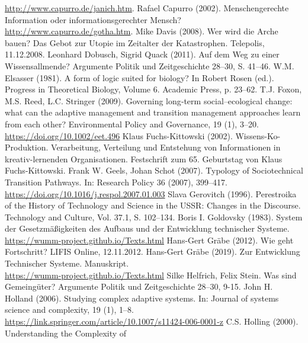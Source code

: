 \documentclass[11pt,a4paper]{article}
\begin{document}
\begin{thebibliography}{xxx}
  \url{http://www.capurro.de/janich.htm}.
 Rafael Capurro (2002). Menschengerechte Information oder
  informationsgerechter Mensch? \url{http://www.capurro.de/gotha.htm}.
 Mike Davis (2008). Wer wird die Arche bauen?  Das Gebot
  zur Utopie im Zeitalter der Katastrophen.  Telepolis, 11.12.2008.
 Leonhard Dobusch, Sigrid Quack (2011). Auf dem Weg zu
  einer Wissensallmende? Argumente Politik und Zeitgeschichte 28--30,
  S. 41--46.
 W.M. Elsasser (1981). A form of logic suited for
  biology? In Robert Rosen (ed.). Progress in Theoretical Biology, Volume 6.
  Academic Press, p. 23--62.
 T.J. Foxon, M.S. Reed, L.C. Stringer (2009). Governing
  long‐term social–ecological change: what can the adaptive management and
  transition management approaches learn from each other? Environmental Policy
  and Governance, 19 (1), 3--20.\\ \url{https://doi.org/10.1002/eet.496}
 Klaus Fuchs-Kittowski (2002). Wissens-Ko-Produktion.
  Verarbeitung, Verteilung und Entstehung von Informationen in
  kreativ-lernenden Organisationen.  Festschrift zum 65. Geburtstag von Klaus
  Fuchs-Kittowski.
 Frank W. Geels, Johan Schot (2007). Typology of
  Sociotechnical Transition Pathways. In: Research Policy 36 (2007),
  399–417.\\ \url{https://doi.org/10.1016/j.respol.2007.01.003}
 Slava Gerovitch (1996). Perestroika of the History of
  Technology and Science in the USSR: Changes in the Discourse. Technology and
  Culture, Vol. 37.1, S. 102--134.
 Boris I. Goldovsky (1983). System der
  Gesetzmäßigkeiten des Aufbaus und der Entwicklung technischer Systeme.
  \url{https://wumm-project.github.io/Texts.html}
 Hans-Gert Gräbe (2012). Wie geht Fortschritt? LIFIS
  Online, 12.11.2012.
 Hans-Gert Gräbe (2019). Zur Entwicklung Technischer
  Systeme.  Manuskript. \\ \url{https://wumm-project.github.io/Texts.html}
 Silke Helfrich, Felix Stein. Was sind Gemeingüter?
  Argumente Politik und Zeitgeschichte 28--30, 9-15.
 John H. Holland (2006). Studying complex adaptive
  systems. In: Journal of systems science and complexity, 19 (1),
  1–8.\\ \url{https://link.springer.com/article/10.1007/s11424-006-0001-z}
 C.S. Holling (2000). Understanding the Complexity of

\end{thebibliography}
\end{document}
